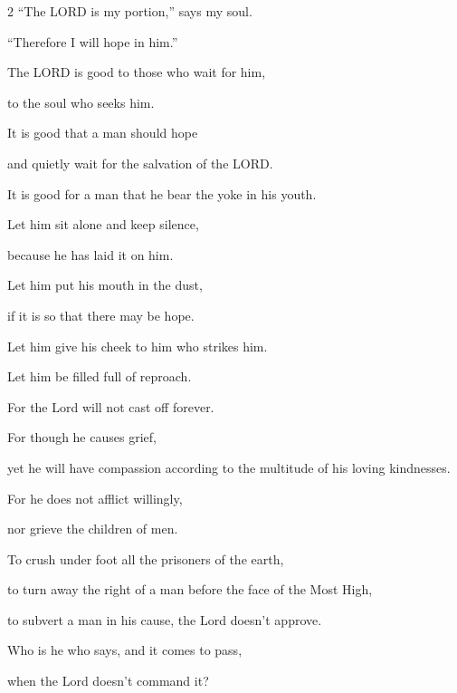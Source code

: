 \begin{multicols}{2}
	\myverse{}“The LORD is my portion,” says my soul.
	
	“Therefore I will hope in him.”

	\vspace{\baselineskip}
	
	\myverse{}The LORD is good to those who wait for him,
	
	to the soul who seeks him.
	
	\myverse{}It is good that a man should hope
	
	and quietly wait for the salvation of the LORD.
	
	\myverse{}It is good for a man that he bear the yoke in his
	youth.

	\vspace{\baselineskip}
	
	\myverse{}Let him sit alone and keep silence,
	
	because he has laid it on him.
	
	\myverse{}Let him put his mouth in the dust,
	
	if it is so that there may be hope.
	
	\myverse{}Let him give his cheek to him who strikes him.
	
	Let him be filled full of reproach.

	\vspace{\baselineskip}
	
	\myverse{}For the Lord will not cast off forever.
	
	\myverse{}For though he causes grief,
	
	yet he will have compassion according to the multitude of his loving kindnesses.
	
	\myverse{}For he does not afflict willingly,
	
	nor grieve the children of men.

	\vspace{\baselineskip}
	
	\myverse{}To crush under foot all the prisoners of the earth,
	
	\myverse{}to turn away the right of a man before the face of
	the Most High,
	
	\myverse{}to subvert a man in his cause, the Lord doesn’t approve.

	\vspace{\baselineskip}
	
	\myverse{}Who is he who says, and it comes to pass,
	
	when the Lord doesn’t command it?
	

\end{multicols}
